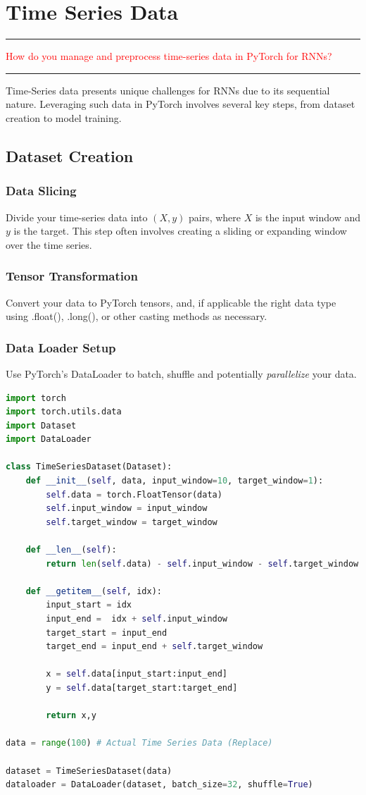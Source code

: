 \documentclass{article}
\begin{document}
\section{Time Series Data}
\noindent
{\color{red} \rule{\linewidth}{0.5mm}}
\textcolor{red}{How do you manage and preprocess time-series data in PyTorch for RNNs?} \\
\noindent
{\color{red} \rule{\linewidth}{0.5mm}}
Time-Series data presents unique challenges for RNNs due to its sequential nature. Leveraging such data in PyTorch involves several key steps, from dataset creation to model training.
\subsection{Dataset Creation}
\subsubsection{Data Slicing}
Divide your time-series data into $(X,y)$ pairs, where $X$ is the input window and $y$ is the target. This step often involves creating a sliding or expanding window over the time series.
\subsubsection{Tensor Transformation}
Convert your data to PyTorch tensors, and, if applicable the right data type using .float(), .long(), or other casting methods as necessary.
\subsubsection{Data Loader Setup}
Use PyTorch's DataLoader to batch, shuffle and potentially \textit{parallelize} your data.
\begin{lstlisting}[language=Python]
import torch
import torch.utils.data
import Dataset
import DataLoader

class TimeSeriesDataset(Dataset):
    def __init__(self, data, input_window=10, target_window=1):
        self.data = torch.FloatTensor(data)
        self.input_window = input_window
        self.target_window = target_window

    def __len__(self):
        return len(self.data) - self.input_window - self.target_window + 1

    def __getitem__(self, idx):
        input_start = idx
        input_end =  idx + self.input_window
        target_start = input_end
        target_end = input_end + self.target_window

        x = self.data[input_start:input_end]
        y = self.data[target_start:target_end]

        return x,y

data = range(100) # Actual Time Series Data (Replace)

dataset = TimeSeriesDataset(data)
dataloader = DataLoader(dataset, batch_size=32, shuffle=True)
\end{lstlisting}
\end{document}
